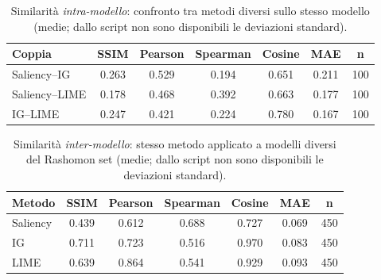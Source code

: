 \documentclass{article}
\begin{document}
\begin{table}[h!]
      \centering
      \renewcommand{\arraystretch}{1.1}
      \begin{tabular}{lccccc c}
            \hline
            \textbf{Coppia} & \textbf{SSIM} & \textbf{Pearson} & \textbf{Spearman} & \textbf{Cosine} & \textbf{MAE} & \textbf{n} \\
            \hline
            Saliency–IG     & 0.263         & 0.529            & 0.194             & 0.651           & 0.211        & 100        \\
            Saliency–LIME   & 0.178         & 0.468            & 0.392             & 0.663           & 0.177        & 100        \\
            IG–LIME         & 0.247         & 0.421            & 0.224             & 0.780           & 0.167        & 100        \\
            \hline
      \end{tabular}
      \caption{Similarità \emph{intra-modello}: confronto tra metodi diversi sullo stesso modello (medie; dallo script non sono disponibili le deviazioni standard).}
      \label{tab:sim_intra}
\end{table}

\begin{table}[h!]
      \centering
      \renewcommand{\arraystretch}{1.1}
      \begin{tabular}{lccccc c}
            \hline
            \textbf{Metodo} & \textbf{SSIM} & \textbf{Pearson} & \textbf{Spearman} & \textbf{Cosine} & \textbf{MAE} & \textbf{n} \\
            \hline
            Saliency        & 0.439         & 0.612            & 0.688             & 0.727           & 0.069        & 450        \\
            IG              & 0.711         & 0.723            & 0.516             & 0.970           & 0.083        & 450        \\
            LIME            & 0.639         & 0.864            & 0.541             & 0.929           & 0.093        & 450        \\
            \hline
      \end{tabular}
      \caption{Similarità \emph{inter-modello}: stesso metodo applicato a modelli diversi del Rashomon set (medie; dallo script non sono disponibili le deviazioni standard).}
      \label{tab:sim_inter}
\end{table}
\end{document}
